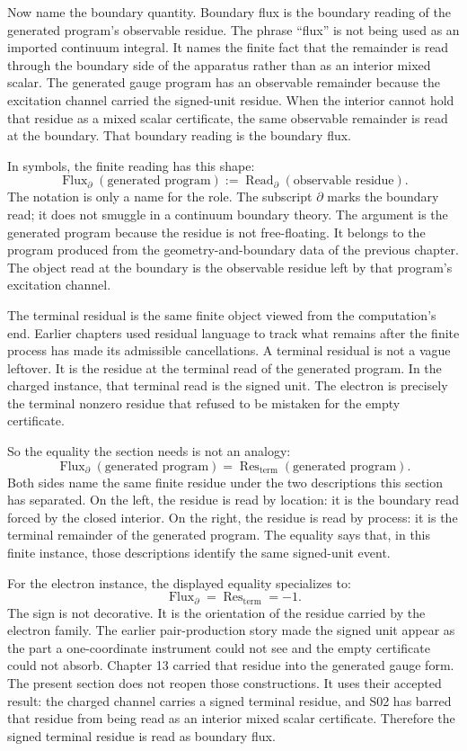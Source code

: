 Now name the boundary quantity. Boundary flux is the boundary reading of the
generated program's observable residue. The phrase ``flux'' is not being used
as an imported continuum integral. It names the finite fact that the remainder
is read through the boundary side of the apparatus rather than as an interior
mixed scalar. The generated gauge program has an observable remainder because
the excitation channel carried the signed-unit residue. When the interior
cannot hold that residue as a mixed scalar certificate, the same observable
remainder is read at the boundary. That boundary reading is the boundary flux.

In symbols, the finite reading has this shape:
\[
  \operatorname{Flux}_{\partial}(\text{generated program})
  :=
  \operatorname{Read}_{\partial}(\text{observable residue}).
\]
The notation is only a name for the role. The subscript \(\partial\) marks the
boundary read; it does not smuggle in a continuum boundary theory. The argument
is the generated program because the residue is not free-floating. It belongs
to the program produced from the geometry-and-boundary data of the previous
chapter. The object read at the boundary is the observable residue left by that
program's excitation channel.

The terminal residual is the same finite object viewed from the computation's
end. Earlier chapters used residual language to track what remains after the
finite process has made its admissible cancellations. A terminal residual is
not a vague leftover. It is the residue at the terminal read of the generated
program. In the charged instance, that terminal read is the signed unit. The
electron is precisely the terminal nonzero residue that refused to be mistaken
for the empty certificate.

So the equality the section needs is not an analogy:
\[
  \operatorname{Flux}_{\partial}(\text{generated program})
  =
  \operatorname{Res}_{\mathrm{term}}(\text{generated program}).
\]
Both sides name the same finite residue under the two descriptions this section
has separated. On the left, the residue is read by location: it is the boundary
read forced by the closed interior. On the right, the residue is read by
process: it is the terminal remainder of the generated program. The equality
says that, in this finite instance, those descriptions identify the same
signed-unit event.

For the electron instance, the displayed equality specializes to:
\[
  \operatorname{Flux}_{\partial}
  =
  \operatorname{Res}_{\mathrm{term}}
  =
  -1.
\]
The sign is not decorative. It is the orientation of the residue carried by the
electron family. The earlier pair-production story made the signed unit appear
as the part a one-coordinate instrument could not see and the empty certificate
could not absorb. Chapter 13 carried that residue into the generated gauge
form. The present section does not reopen those constructions. It uses their
accepted result: the charged channel carries a signed terminal residue, and
S02 has barred that residue from being read as an interior mixed scalar
certificate. Therefore the signed terminal residue is read as boundary flux.

